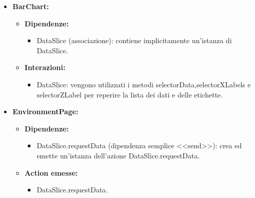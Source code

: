 \begin{itemize}
    \item \textbf{BarChart:}
    \begin{itemize}
        \item \textbf{Dipendenze:}
        \begin{itemize}
            \item DataSlice (associazione): contiene implicitamente un'istanza di DataSlice.
        \end{itemize} 
        \item \textbf{Interazioni:}
        \begin{itemize}
            \item DataSlice: vengono utilizzati i metodi selectorData,selectorXLabels e selectorZLabel per reperire la lista dei dati e delle etichette.
        \end{itemize} 
    \end{itemize}

    \item \textbf{EnvironmentPage:}
    \begin{itemize}
        \item \textbf{Dipendenze:}
        \begin{itemize}
            \item DataSlice.requestData (dipendenza semplice <<send>>): crea ed emette un’istanza dell’azione DataSlice.requestData.
        \end{itemize} 
        \item \textbf{Action emesse:}
        \begin{itemize}
            \item DataSlice.requestData.
        \end{itemize} 
    \end{itemize}
\end{itemize}

\pagebreak

